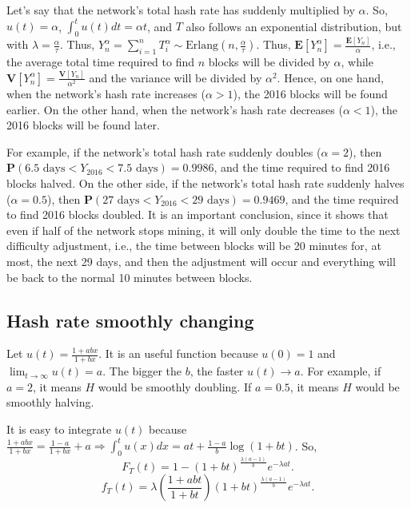 Let's say that the network's total hash rate has suddenly multiplied by $\alpha$. So, $u(t) = \alpha$, $\int_0^t u(t) dt = \alpha t$, and $T$ also follows an exponential distribution, but with $\lambda = \frac{\alpha}{\tau}$. Thus, $Y_n^\alpha = \sum_{i=1}^{n} T_i^\alpha \sim \text{Erlang}(n, \frac{\alpha}{\tau})$. Thus, $\mathbf{E}[Y_{n}^\alpha] = \frac{\mathbf{E}[Y_{n}]}{\alpha}$, i.e., the average total time required to find $n$ blocks will be divided by $\alpha$, while $\mathbf{V}[Y_{n}^\alpha] = \frac{\mathbf{V}[Y_n]}{\alpha^2}$ and the variance will be divided by $\alpha^2$. Hence, on one hand, when the network's hash rate increases ($\alpha > 1$), the 2016 blocks will be found earlier. On the other hand, when the network's hash rate decreases ($\alpha < 1$), the 2016 blocks will be found later.

For example, if the network's total hash rate suddenly doubles ($\alpha = 2$), then $\mathbf{P}(6.5 \text{ days} < Y_{2016} < 7.5 \text{ days}) = 0.9986$, and the time required to find 2016 blocks halved. On the other side, if the network's total hash rate suddenly halves ($\alpha = 0.5$), then $\mathbf{P}(27 \text{ days} < Y_{2016} < 29 \text{ days}) = 0.9469$, and the time required to find 2016 blocks doubled. It is an important conclusion, since it shows that even if half of the network stops mining, it will only double the time to the next difficulty adjustment, i.e., the time between blocks will be 20 minutes for, at most, the next 29 days, and then the adjustment will occur and everything will be back to the normal 10 minutes between blocks.


\subsection{Hash rate smoothly changing}

Let $u(t) = \frac{1+abx}{1+bx}$. It is an useful function because $u(0) = 1$ and $\lim_{t \rightarrow \infty} u(t) = a$. The bigger the $b$, the faster $u(t) \rightarrow a$. For example, if $a=2$, it means $H$ would be smoothly doubling. If $a=0.5$, it means $H$ would be smoothly halving.

It is easy to integrate $u(t)$ because $\frac{1+abx}{1+bx} = \frac{1-a}{1+bx} + a \Rightarrow \int_0^t u(x) dx = at + \frac{1-a}{b} \log(1+bt)$. So,
$$F_T(t) = 1 - (1+bt)^{\frac{\lambda(a-1)}{b}} e^{-\lambda at}.$$
$$f_T(t) = \lambda \left( \frac{1+abt}{1+bt} \right) (1+bt)^{\frac{\lambda(a-1)}{b}} e^{-\lambda at}.$$

